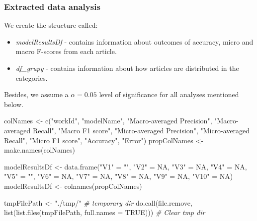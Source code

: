 \documentclass[
]{article}
\newenvironment{Shaded}{\begin{snugshade}}{\end{snugshade}}
\newcommand{\AttributeTok}[1]{\textcolor[rgb]{0.77,0.63,0.00}{#1}}
\newcommand{\CommentTok}[1]{\textcolor[rgb]{0.56,0.35,0.01}{\textit{#1}}}
\newcommand{\ConstantTok}[1]{\textcolor[rgb]{0.00,0.00,0.00}{#1}}
\newcommand{\FunctionTok}[1]{\textcolor[rgb]{0.00,0.00,0.00}{#1}}
\newcommand{\NormalTok}[1]{#1}
\newcommand{\OtherTok}[1]{\textcolor[rgb]{0.56,0.35,0.01}{#1}}
\newcommand{\StringTok}[1]{\textcolor[rgb]{0.31,0.60,0.02}{#1}}
\providecommand{\tightlist}{%
  \setlength{\itemsep}{0pt}\setlength{\parskip}{0pt}}
\begin{document}
\hypertarget{extracted-data-analysis}{%
\subsubsection{Extracted data analysis}\label{extracted-data-analysis}}

We create the structure called:

\begin{itemize}
\tightlist
\item
  \emph{modelResultsDf} - contains information about outcomes of accuracy, micro and macro F-scores from each article.
\item
  \emph{df\_grupy} - contains information about how articles are distributed in the categories.
\end{itemize}

Besides, we assume a \(\alpha = 0.05\) level of significance for all analyses mentioned below.

\begin{Shaded}
\begin{Highlighting}[]
\NormalTok{colNames }\OtherTok{\textless{}{-}} \FunctionTok{c}\NormalTok{(}\StringTok{"workId"}\NormalTok{, }\StringTok{"modelName"}\NormalTok{, }\StringTok{"Macro{-}averaged Precision"}\NormalTok{, }
              \StringTok{"Macro{-}averaged Recall"}\NormalTok{, }\StringTok{"Macro F1 score"}\NormalTok{, }\StringTok{"Micro{-}averaged Precision"}\NormalTok{, }
              \StringTok{"Micro{-}averaged Recall"}\NormalTok{, }\StringTok{"Micro F1 score"}\NormalTok{, }\StringTok{"Accuracy"}\NormalTok{, }\StringTok{"Error"}\NormalTok{)}
\NormalTok{propColNames }\OtherTok{\textless{}{-}} \FunctionTok{make.names}\NormalTok{(colNames)}

\NormalTok{modelResultsDf }\OtherTok{\textless{}{-}} \FunctionTok{data.frame}\NormalTok{(}\StringTok{"V1"} \OtherTok{=} \StringTok{""}\NormalTok{, }\StringTok{"V2"} \OtherTok{=} \ConstantTok{NA}\NormalTok{, }\StringTok{"V3"} \OtherTok{=} \ConstantTok{NA}\NormalTok{, }\StringTok{"V4"} \OtherTok{=} \ConstantTok{NA}\NormalTok{,}
                             \StringTok{"V5"} \OtherTok{=} \StringTok{""}\NormalTok{, }\StringTok{"V6"} \OtherTok{=} \ConstantTok{NA}\NormalTok{, }\StringTok{"V7"} \OtherTok{=} \ConstantTok{NA}\NormalTok{, }\StringTok{"V8"} \OtherTok{=} \ConstantTok{NA}\NormalTok{, }\StringTok{"V9"} \OtherTok{=} \ConstantTok{NA}\NormalTok{, }\StringTok{"V10"} \OtherTok{=} \ConstantTok{NA}\NormalTok{)}
\NormalTok{modelResultsDf }\OtherTok{\textless{}{-}} \FunctionTok{colnames}\NormalTok{(propColNames)}

\NormalTok{tmpFilePath }\OtherTok{\textless{}{-}} \StringTok{"./tmp/"} \CommentTok{\# temporary dir}
\FunctionTok{do.call}\NormalTok{(file.remove, }\FunctionTok{list}\NormalTok{(}\FunctionTok{list.files}\NormalTok{(tmpFilePath, }\AttributeTok{full.names =} \ConstantTok{TRUE}\NormalTok{))) }\CommentTok{\# Clear tmp dir}
\end{Highlighting}
\end{Shaded}
\end{document}
